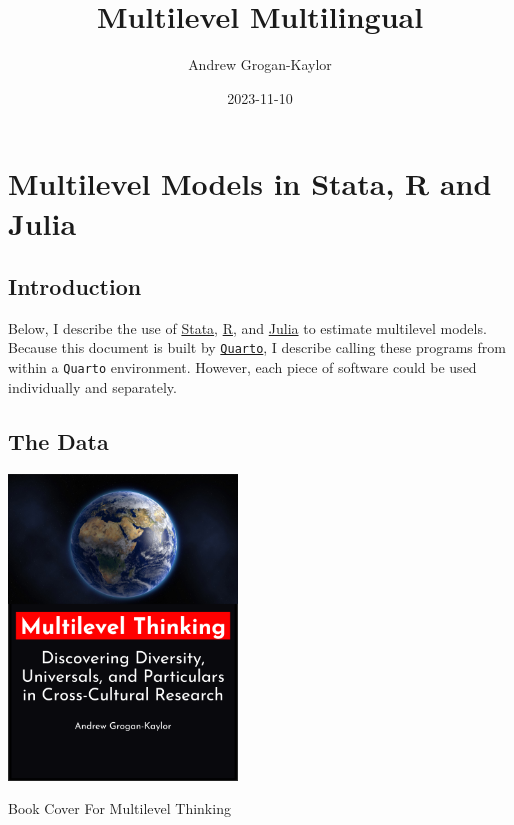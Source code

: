 \documentclass[
  letterpaper,
  DIV=11,
  numbers=noendperiod,
  oneside]{scrreprt}
\title{Multilevel Multilingual}
\author{Andrew Grogan-Kaylor}
\date{2023-11-10}
\renewcommand*\contentsname{Table of contents}
\newcommand\contentsname{Table of contents}
\begin{document}
\maketitle
\ifdefined\Shaded\renewenvironment{Shaded}{\begin{tcolorbox}[sharp corners, boxrule=0pt, breakable, frame hidden, interior hidden, borderline west={3pt}{0pt}{shadecolor}, enhanced]}{\end{tcolorbox}}\fi

\renewcommand*\contentsname{Table of contents}
{
\hypersetup{linkcolor=}
\setcounter{tocdepth}{2}
\tableofcontents
}
\listoffigures
\listoftables
{}

\hypertarget{multilevel-models-in-stata-r-and-julia}{%
\chapter{Multilevel Models in Stata, R and
Julia}\label{multilevel-models-in-stata-r-and-julia}}

\hypertarget{introduction}{%
\section{Introduction}\label{introduction}}

Below, I describe the use of \href{https://www.stata.com/}{Stata},
\href{https://www.r-project.org/}{R}, and
\href{https://www.julialang.org/}{Julia} to estimate multilevel models.
Because this document is built by
\href{https://quarto.org/}{\texttt{Quarto}}, I describe calling these
programs from within a \texttt{Quarto} environment. However, each piece
of software could be used individually and separately.

\hypertarget{the-data}{%
\section{The Data}\label{the-data}}

\begin{marginfigure}

{\centering \includegraphics[width=2.4in,height=\textheight]{bookcover.png}

}

\caption{\label{fig-bookcover}Book Cover For Multilevel Thinking}

\end{marginfigure}
\end{document}
